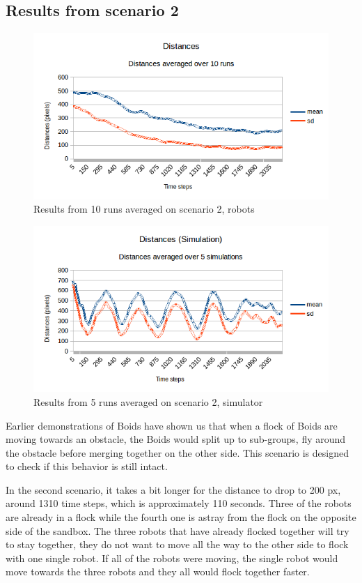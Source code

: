 \subsection{Results from scenario 2}
\label{sec:res2}
\begin{figure}[h]
\begin{center}
\includegraphics[width=0.8\linewidth]{figs/runs/2pdist}
\end{center}
\caption[2. Distances, robots]{Results from 10 runs averaged on scenario 2, robots}
\label{fig:res2pdist}
\end{figure}
\begin{figure}[h]
\begin{center}
\includegraphics[width=0.8\linewidth]{figs/runs/2sdist}
\end{center}
\caption[2. Distances, simulation]{Results from 5 runs averaged on scenario 2, simulator}
\label{fig:res2sdist}
\end{figure}
Earlier demonstrations of Boids have shown us that when a flock of Boids are moving towards an obstacle, the Boids would split up to sub-groups, fly around the obstacle before merging together on the other side. This scenario is designed to check if this behavior is still intact.

In the second scenario, it takes a bit longer for the distance to drop to 200 px, around 1310 time steps, which is approximately 110 seconds.
Three of the robots are already in a flock while the fourth one is astray from the flock on the opposite side of the sandbox. The three robots that have already flocked together will try to stay together, they do not want to move all the way to the other side to flock with one single robot. If all of the robots were moving, the single robot would move towards the three robots and they all would flock together faster.

